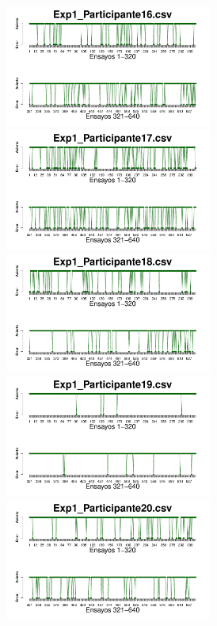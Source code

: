 \documentclass[a4paper ]{article}
\begin{document}
\begin{figure}[th]
\begin{center}
\includegraphics[width=8cm, height=4cm]{Figures/Success_Exp1_P16} \includegraphics[width=8cm, height=4cm]{Figures/Success_Exp1_P17} \includegraphics[width=8cm, height=4cm]{Figures/Success_Exp1_P18}
\includegraphics[width=8cm, height=4cm]{Figures/Success_Exp1_P19} \includegraphics[width=8cm, height=4cm]{Figures/Success_Exp1_P20} 
\end{center}
\end{figure}
\clearpage
\end{document}
